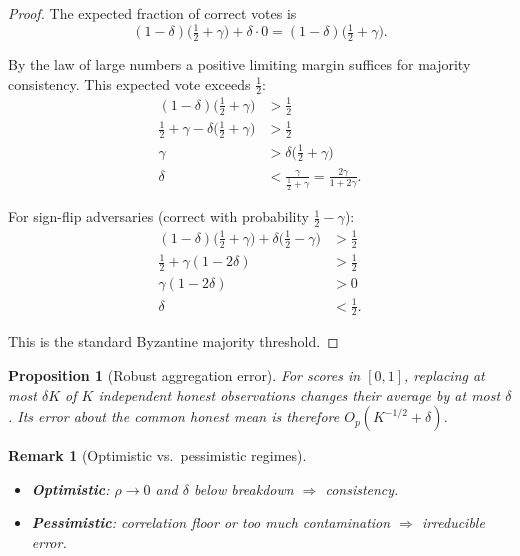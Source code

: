\documentclass[11pt]{article}
\newtheorem{proposition}[theorem]{Proposition}
\newtheorem{remark}[theorem]{Remark}
\begin{document}
\begin{proof}
The expected fraction of correct votes is
\begin{equation}
(1-\delta)\Big(\tfrac{1}{2} + \gamma\Big) + \delta \cdot 0
= (1-\delta)\Big(\tfrac{1}{2} + \gamma\Big).
\end{equation}

By the law of large numbers a positive limiting margin suffices for majority consistency. This expected vote exceeds $\frac{1}{2}$:
\begin{align}
(1-\delta)\Big(\tfrac{1}{2} + \gamma\Big) &> \tfrac{1}{2} \\
\tfrac{1}{2} + \gamma - \delta\Big(\tfrac{1}{2} + \gamma\Big) &> \tfrac{1}{2} \\
\gamma &> \delta\Big(\tfrac{1}{2} + \gamma\Big) \\
\delta &< \frac{\gamma}{\frac{1}{2} + \gamma} = \frac{2\gamma}{1 + 2\gamma}.
\end{align}

For sign-flip adversaries (correct with probability $\frac{1}{2} - \gamma$):
\begin{align}
(1-\delta)\Big(\tfrac{1}{2} + \gamma\Big) + \delta\Big(\tfrac{1}{2} - \gamma\Big) &> \tfrac{1}{2} \\
\tfrac{1}{2} + \gamma(1-2\delta) &> \tfrac{1}{2} \\
\gamma(1-2\delta) &> 0 \\
\delta &< \tfrac{1}{2}.
\end{align}

This is the standard Byzantine majority threshold.
\end{proof}

\begin{proposition}[Robust aggregation error]
\label{prop:robust-aggregation}
For scores in $[0,1]$, replacing at most $\delta K$ of $K$ independent honest observations changes their average by at most $\delta$. Its error about the common honest mean is therefore $O_p(K^{-1/2}+\delta)$.
\end{proposition}

\begin{remark}[Optimistic vs.\ pessimistic regimes]
\begin{itemize}
\item \textbf{Optimistic}: $\rho \to 0$ and $\delta$ below breakdown
  $\Longrightarrow$ consistency.
\item \textbf{Pessimistic}: correlation floor or too much contamination
  $\Longrightarrow$ irreducible error.
\end{itemize}
\end{remark}
\end{document}
